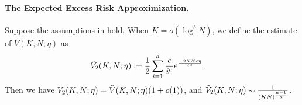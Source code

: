 \paragraph{The Expected Excess Risk Approximization.}
\begin{lemma} \label{lem:one-hot-log-loss-estimate-small-K}
    Suppose the assumptions in  hold. When $K = o(\log^b N)$, we define the estimate of $V(K,N;\eta)$ as
    \begin{align*}
        \Tilde{V}_2(K,N;\eta) &:= \frac{1}{2}\sum_{i=1}^{d}\frac{c}{i^{a}}e^{\frac{-2KNc\eta}{i^{a}}}.
    \end{align*}
    Then we have $V_2(K,N;\eta) = \Tilde{V}(K,N;\eta)(1 + o(1))$, and 
    $\Tilde{V}_2(K,N;\eta) \eqsim \frac{1}{(KN)^{\frac{a-1}{a}}}$.
\end{lemma}

